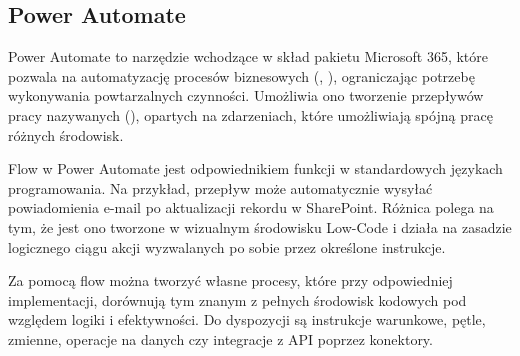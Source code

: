 \subsection{Power Automate}

Power Automate to narzędzie wchodzące w skład pakietu Microsoft 365, które pozwala na automatyzację procesów biznesowych (, ), ograniczając potrzebę wykonywania powtarzalnych czynności. Umożliwia ono tworzenie przepływów pracy nazywanych  (), opartych na zdarzeniach, które umożliwiają spójną pracę różnych środowisk.

Flow w Power Automate jest odpowiednikiem funkcji w standardowych językach programowania. Na przykład, przepływ może automatycznie wysyłać powiadomienia e-mail po aktualizacji rekordu w SharePoint. Różnica polega na tym, że jest ono tworzone w wizualnym środowisku Low-Code i działa na zasadzie logicznego ciągu akcji wyzwalanych po sobie przez określone instrukcje.

Za pomocą flow można tworzyć własne procesy, które przy odpowiedniej implementacji, dorównują tym znanym z pełnych środowisk kodowych pod względem logiki i efektywności. Do dyspozycji są instrukcje warunkowe, pętle, zmienne, operacje na danych czy integracje z API poprzez konektory.
